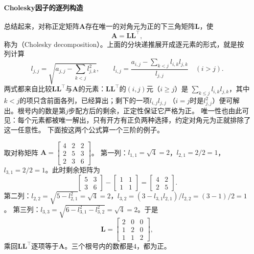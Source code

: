 \paragraph{Cholesky因子的逐列构造}

总结起来，对称正定矩阵$\bm A$存在唯一的对角元为正的下三角矩阵$\bm L$，使
\begin{equation}
 \bm A=\bm L\bm L^\top,
 \label{eq:matrix-analysis-cholesky}
\end{equation}
称为（Cholesky decomposition）。上面的分块递推展开成逐元素的形式，就是按列计算
\begin{equation}
 l_{j,j}=\sqrt{a_{j,j}-\sum_{k<j}l_{j,k}^2},\qquad
 l_{i,j}=\frac{a_{i,j}-\sum_{k<j}l_{i,k}l_{j,k}}{l_{j,j}}\quad(i>j).
\end{equation}
两式都来自比较$\bm L\bm L^\top$与$\bm A$的元素：$\bm L\bm L^\top$的$(i,j)$元（$i\geq j$）是
$\sum_{k\leq j}l_{i,k}l_{j,k}$，其中$k<j$的项只含前面各列，已经算出；剩下的一项$l_{i,j}l_{j,j}$
（$i=j$时是$l_{j,j}^2$）便可解出。根号内的数是第$j$步配方后的剩余，正定性保证它严格为正。
唯一性也由此可见：每个元素都被唯一解出，只有开方有正负两种选择，约定对角元为正就排除了这一任意性。
下面按这两个公式算一个三阶的例子。

\begin{example}[逐列计算Cholesky因子]
\label{ex:ls-cholesky-three-by-three}
取对称矩阵
$\bm A=\left[\begin{smallmatrix}4&2&2\\2&5&3\\2&3&6\end{smallmatrix}\right]$。
第一列：$l_{1,1}=\sqrt4=2$，$l_{2,1}=2/2=1$，$l_{3,1}=2/2=1$。此时剩余矩阵为
\[
 \begin{bmatrix}5&3\\3&6\end{bmatrix}-\begin{bmatrix}1&1\\1&1\end{bmatrix}
 =\begin{bmatrix}4&2\\2&5\end{bmatrix}.
\]
第二列：$l_{2,2}=\sqrt{5-l_{2,1}^2}=\sqrt4=2$，$l_{3,2}=(3-l_{3,1}l_{2,1})/l_{2,2}=(3-1)/2=1$。
第三列：$l_{3,3}=\sqrt{6-l_{3,1}^2-l_{3,2}^2}=\sqrt4=2$。于是
\[
 \bm L=\begin{bmatrix}2&0&0\\1&2&0\\1&1&2\end{bmatrix},
\]
乘回$\bm L\bm L^\top$逐项等于$\bm A$。三个根号内的数都是$4$，都为正。
\end{example}

